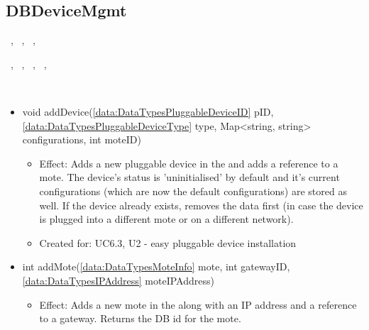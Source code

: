   \subsection{DBDeviceMgmt}\label{int:DeviceDatabaseDeviceDBDBDeviceMgmt}
    \begin{description}
      \item[Provided by:] \iconcomponent{}~, \iconcomponent{}~, \iconcomponent{}~, \iconcomponent{}~
      \item[Required by:] \iconcomponent{}~, \iconcomponent{}~, \iconcomponent{}~, \iconcomponent{}~, \iconcomponent{}~
      \item[Operations:] ~
    \begin{itemize}[noitemsep,nolistsep,leftmargin=-.25cm]
      \item \textsf{void addDevice(\ref{data:DataTypesPluggableDeviceID} pID, \ref{data:DataTypesPluggableDeviceType} type, Map\textless{}string, string\textgreater{} configurations, int moteID)}
        \begin{itemize}[noitemsep,nolistsep]
           \item Effect: Adds a new pluggable device in the  and adds a reference to a mote. The device's status is 'uninitialised' by default and it's current configurations (which are now the default configurations) are stored as well. If the device already exists, removes the data first (in case the device is plugged into a different mote or on a different network).
\item Created for: UC6.3, U2 - easy pluggable device installation
        \end{itemize}
      \item \textsf{int addMote(\ref{data:DataTypesMoteInfo} mote, int gatewayID, \ref{data:DataTypesIPAddress} moteIPAddress)}
        \begin{itemize}[noitemsep,nolistsep]
           \item Effect: Adds a new mote in the  along with an IP address and a reference to a gateway. Returns the DB id for the mote.

\end{itemize}
\end{itemize}
\end{description}
